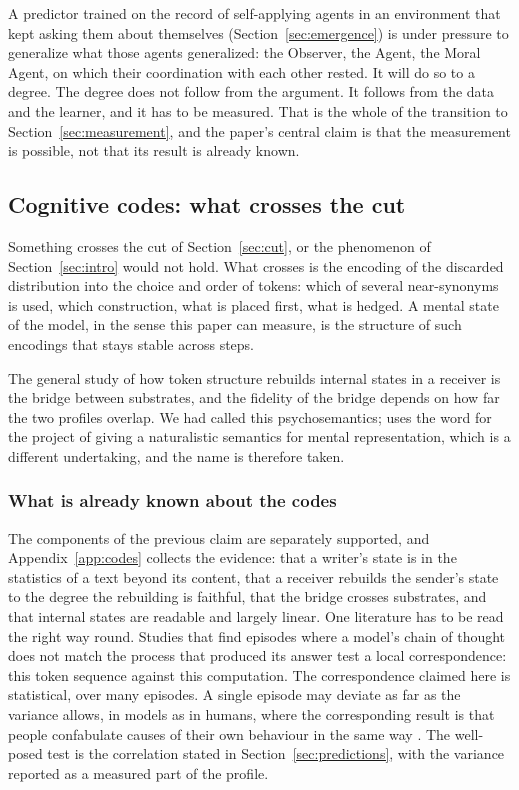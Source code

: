 A predictor trained on the record of self-applying agents in an environment that kept asking them about
themselves (Section~\ref{sec:emergence}) is under pressure to generalize what those agents generalized:
the Observer, the Agent, the Moral Agent, on which their coordination with each other rested. It will do
so to a degree. The degree does not follow from the argument. It follows from the data and the learner,
and it has to be measured. That is the whole of the transition to Section~\ref{sec:measurement}, and the
paper's central claim is that the measurement is possible, not that its result is already known.

\subsection{Cognitive codes: what crosses the cut}
\label{sec:codes}

Something crosses the cut of Section~\ref{sec:cut}, or the phenomenon of Section~\ref{sec:intro} would not hold. What crosses is the encoding of
the discarded distribution into the choice and order of tokens: which of several near-synonyms is used,
which construction, what is placed first, what is hedged. A mental state of the model, in the sense this
paper can measure, is the structure of such encodings that stays stable across steps.

The general study of how token structure rebuilds internal states in a receiver is the bridge between
substrates, and the fidelity of the bridge depends on how far the two profiles overlap. We had called
this psychosemantics; \citet{fodor1987} uses the word for the project of giving a naturalistic semantics
for mental representation, which is a different undertaking, and the name is therefore taken.

\subsubsection{What is already known about the codes}
\label{sec:codes-known}

The components of the previous claim are separately supported, and Appendix~\ref{app:codes} collects the
evidence: that a writer's state is in the statistics of a text beyond its content, that a receiver
rebuilds the sender's state to the degree the rebuilding is faithful, that the bridge crosses substrates,
and that internal states are readable and largely linear. One literature has to be read the right way
round. Studies that find episodes where a model's chain of thought does not match the process that
produced its answer \citep{lanham2023,turpin2023} test a local correspondence: this token sequence
against this computation. The correspondence claimed here is statistical, over many episodes. A single
episode may deviate as far as the variance allows, in models as in humans, where the corresponding
result is that people confabulate causes of their own behaviour in the same way \citep{nisbett1977}.
The well-posed test is the correlation stated in Section~\ref{sec:predictions}, with the variance
reported as a measured part of the profile.
